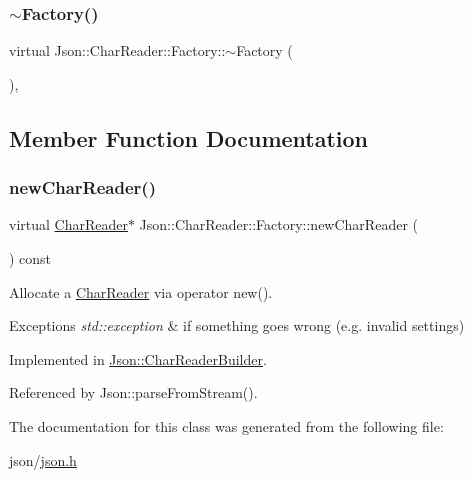 \subsubsection{\texorpdfstring{$\sim$\+Factory()}{~Factory()}}
{\footnotesize\ttfamily virtual Json\+::\+Char\+Reader\+::\+Factory\+::$\sim$\+Factory (\begin{DoxyParamCaption}{ }\end{DoxyParamCaption})\hspace{0.3cm}{\ttfamily [inline]}, {\ttfamily [virtual]}}



\subsection{Member Function Documentation}
\mbox{\label{classJson_1_1CharReader_1_1Factory_a4c5862a1ffd432372dbe65cf59de98c4_a4c5862a1ffd432372dbe65cf59de98c4}} 
\subsubsection{\texorpdfstring{new\+Char\+Reader()}{newCharReader()}}
{\footnotesize\ttfamily virtual \hyperlink{classJson_1_1CharReader}{Char\+Reader}$\ast$ Json\+::\+Char\+Reader\+::\+Factory\+::new\+Char\+Reader (\begin{DoxyParamCaption}{ }\end{DoxyParamCaption}) const\hspace{0.3cm}{\ttfamily [pure virtual]}}



Allocate a \hyperlink{classJson_1_1CharReader}{Char\+Reader} via operator new(). 


\begin{DoxyExceptions}{Exceptions}
{\em std\+::exception} & if something goes wrong (e.\+g. invalid settings) \\
\hline
\end{DoxyExceptions}


Implemented in \hyperlink{classJson_1_1CharReaderBuilder_a3a262fcc76c1eb8eebfd4718fb4e9722_a3a262fcc76c1eb8eebfd4718fb4e9722}{Json\+::\+Char\+Reader\+Builder}.



Referenced by Json\+::parse\+From\+Stream().



The documentation for this class was generated from the following file\+:\begin{DoxyCompactItemize}
\item 
json/\hyperlink{json_8h}{json.\+h}\end{DoxyCompactItemize}
